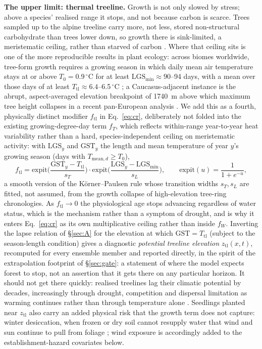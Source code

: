 \textbf{The upper limit: thermal treeline.} Growth is not only slowed by stress; above a species' realised range it stops, and not because carbon is scarce. Trees sampled up to the alpine treeline carry more, not less, stored non-structural carbohydrate than trees lower down, so growth there is sink-limited, a meristematic ceiling, rather than starved of carbon \citep{Hoch2002}. Where that ceiling sits is one of the more reproducible results in plant ecology: across biomes worldwide, tree-form growth requires a growing season in which daily mean air temperature stays at or above $T_0=0.9\,^\circ$C for at least $\mathrm{LGS}_{\min}\approx90$--94 days, with a mean over those days of at least $T_{\text{tl}}\approx6.4$--6.5\,$^\circ$C \citep{KornerPaulsen2004,PaulsenKorner2014}; a Caucasus-adjacent instance is the abrupt, aspect-averaged elevation breakpoint of 1740~m above which maximum tree height collapses in a recent pan-European analysis \citep{Gelabert2024}. We add this as a fourth, physically distinct modifier $f_{\text{tl}}$ in Eq.~\eqref{eq:cr}, deliberately not folded into the existing growing-degree-day term $f_T$, which reflects within-range year-to-year heat variability rather than a hard, species-independent ceiling on meristematic activity: with $\mathrm{LGS}_y$ and $\mathrm{GST}_y$ the length and mean temperature of year $y$'s growing season (days with $T_{\text{mean},d}\ge T_0$),
\begin{equation}\label{eq:treeline}
f_{\text{tl}}=\mathrm{expit}\!\Big(\frac{\mathrm{GST}_y-T_{\text{tl}}}{s_T}\Big)\cdot\mathrm{expit}\!\Big(\frac{\mathrm{LGS}_y-\mathrm{LGS}_{\min}}{s_L}\Big),\qquad \mathrm{expit}(u)=\frac{1}{1+e^{-u}},
\end{equation}
a smooth version of the Körner--Paulsen rule whose transition widths $s_T,s_L$ are fitted, not assumed, from the growth collapse of high-elevation tree-ring chronologies. As $f_{\text{tl}}\to0$ the physiological age stops advancing regardless of water status, which is the mechanism rather than a symptom of drought, and is why it enters Eq.~\eqref{eq:cr} as its own multiplicative ceiling rather than inside $f_W$. Inverting the lapse relation of \S\ref{sec:A} for the elevation at which $\mathrm{GST}=T_{\text{tl}}$ (subject to the season-length condition) gives a diagnostic \emph{potential treeline elevation} $z_{\text{tl}}(x,t)$, recomputed for every ensemble member and reported directly, in the spirit of the extrapolation footprint of \S\ref{sec:gate}: a statement of where the model expects forest to stop, not an assertion that it gets there on any particular horizon. It should not get there quickly: realised treelines lag their climatic potential by decades, increasingly through drought, competition and dispersal limitation as warming continues rather than through temperature alone \citep{Lu2025}. Seedlings planted near $z_{\text{tl}}$ also carry an added physical risk that the growth term does not capture: winter desiccation, when frozen or dry soil cannot resupply water that wind and sun continue to pull from foliage \citep{Tranquillini1979}; wind exposure is accordingly added to the establishment-hazard covariates below.

